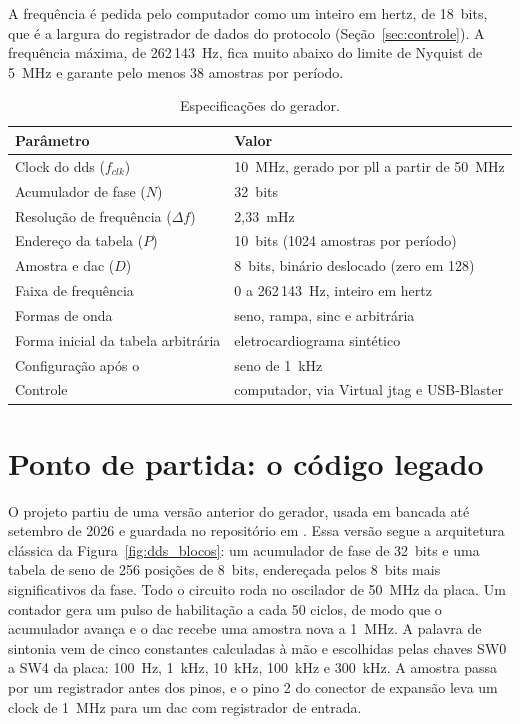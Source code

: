 A frequência é pedida pelo computador como um inteiro em hertz, de 18~bits, que é a largura do registrador de dados do protocolo (Seção~\ref{sec:controle}). A frequência máxima, de 262\,143~Hz, fica muito abaixo do limite de Nyquist de 5~MHz e garante pelo menos 38 amostras por período.

\begin{table}
	\caption{Especificações do gerador.}
	\label{tab:especificacoes}
	\begin{tabular}{l l}\toprule
		Parâmetro & Valor\\\midrule
		Clock do \ac{dds} (\(f_{clk}\)) & 10~MHz, gerado por \ac{pll} a partir de 50~MHz\\
		Acumulador de fase (\(N\)) & 32~bits\\
		Resolução de frequência (\(\Delta f\)) & 2,33~mHz\\
		Endereço da tabela (\(P\)) & 10~bits (1024 amostras por período)\\
		Amostra e \ac{dac} (\(D\)) & 8~bits, binário deslocado (zero em 128)\\
		Faixa de frequência & 0 a 262\,143~Hz, inteiro em hertz\\
		Formas de onda & seno, rampa, sinc e arbitrária\\
		Forma inicial da tabela arbitrária & eletrocardiograma sintético\\
		Configuração após o \eng{reset} & seno de 1~kHz\\
		Controle & computador, via Virtual \ac{jtag} e USB-Blaster\\\bottomrule
	\end{tabular}
\end{table}

\section{Ponto de partida: o código legado}\label{sec:legado}

O projeto partiu de uma versão anterior do gerador, usada em bancada até setembro de 2026 e guardada no repositório em . Essa versão segue a arquitetura clássica da Figura~\ref{fig:dds_blocos}: um acumulador de fase de 32~bits e uma tabela de seno de 256 posições de 8~bits, endereçada pelos 8~bits mais significativos da fase. Todo o circuito roda no oscilador de 50~MHz da placa. Um contador gera um pulso de habilitação a cada 50 ciclos, de modo que o acumulador avança e o \ac{dac} recebe uma amostra nova a 1~MHz. A palavra de sintonia vem de cinco constantes calculadas à mão e escolhidas pelas chaves SW0 a SW4 da placa: 100~Hz, 1~kHz, 10~kHz, 100~kHz e 300~kHz. A amostra passa por um registrador antes dos pinos, e o pino 2 do conector de expansão leva um clock de 1~MHz para um \ac{dac} com registrador de entrada.

